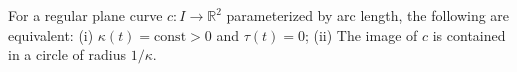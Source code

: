 For a regular plane curve $c: I \to \mathbb{R}^2$ parameterized by arc length, the following are equivalent:
(i) $\kappa(t) = \text{const} > 0$ and $\tau(t) = 0$;
(ii) The image of $c$ is contained in a circle of radius $1/\kappa$.